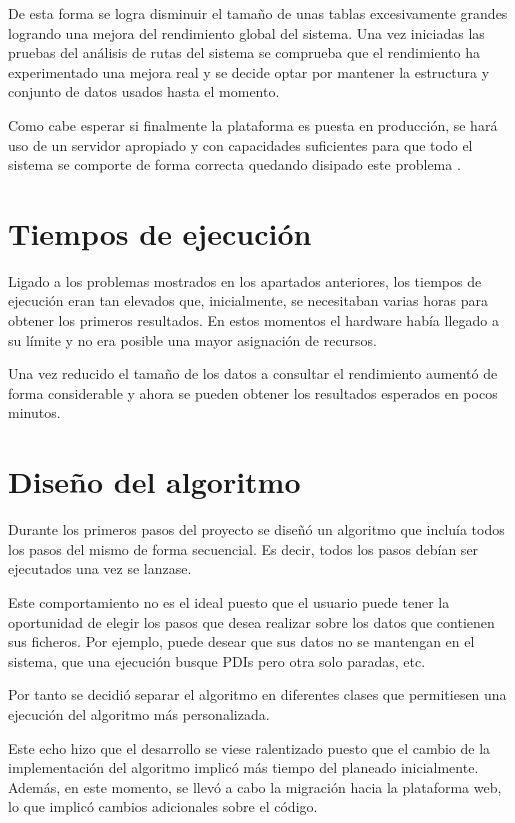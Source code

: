 De esta forma se logra disminuir el tamaño de unas tablas excesivamente grandes logrando una mejora del rendimiento global del sistema. Una vez iniciadas las pruebas del análisis de rutas del sistema se comprueba que el rendimiento ha experimentado una mejora real y se decide optar por mantener la estructura y conjunto de datos usados hasta el momento.


Como cabe esperar si finalmente la plataforma es puesta en producción, se hará uso de un servidor apropiado y con capacidades suficientes para que todo el sistema se comporte de forma correcta quedando disipado este problema .


\section{Tiempos de ejecución}
Ligado a los problemas mostrados en los apartados anteriores, los tiempos de ejecución eran tan elevados que, inicialmente, se necesitaban varias horas para obtener los primeros resultados. En estos momentos el hardware había llegado a su límite y no era posible una mayor asignación de recursos.

Una vez reducido el tamaño de los datos a consultar el rendimiento aumentó de forma considerable y ahora se pueden obtener los resultados esperados en pocos minutos.


\section{Diseño del algoritmo}
Durante los primeros pasos del proyecto se diseñó un algoritmo que incluía todos los pasos del mismo de forma secuencial. Es decir, todos los pasos debían ser ejecutados una vez se lanzase.

Este comportamiento no es el ideal puesto que el usuario puede tener la oportunidad de elegir los pasos que desea realizar sobre los datos que contienen sus ficheros. Por ejemplo, puede desear que sus datos no se mantengan en el sistema, que una ejecución busque PDIs pero otra solo paradas, etc.

Por tanto se decidió separar el algoritmo en diferentes clases que permitiesen una ejecución del algoritmo más personalizada.

Este echo hizo que el desarrollo se viese ralentizado puesto que el cambio de la implementación del algoritmo implicó más tiempo del planeado inicialmente. Además, en este momento, se llevó a cabo la migración hacia la plataforma web, lo que implicó cambios adicionales sobre el código.


